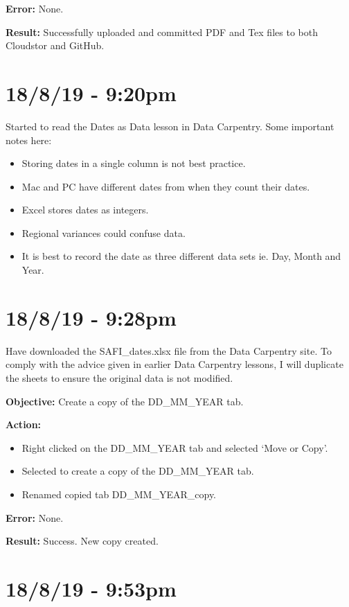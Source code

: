 \documentclass{article}
\begin{document}
\textbf{Error:} None.

\textbf{Result:} Successfully uploaded and committed PDF and Tex files to both Cloudstor and GitHub.

\section*{18/8/19 - 9:20pm}

Started to read the Dates as Data lesson in Data Carpentry. Some important notes here:

\begin{itemize}
    \item Storing dates in a single column is not best practice.
    \item Mac and PC have different dates from when they count their dates.
    \item Excel stores dates as integers.
    \item Regional variances could confuse data.
    \item It is best to record the date as three different data sets ie. Day, Month and Year.
\end{itemize}

\section*{18/8/19 - 9:28pm}

Have downloaded the SAFI\_dates.xlsx file from the Data Carpentry site. To comply with the advice given in earlier Data Carpentry lessons, I will duplicate the sheets to ensure the original data is not modified.

\textbf{Objective:} Create a copy of the DD\_MM\_YEAR tab.

\textbf{Action:}
\begin{itemize}
    \item Right clicked on the DD\_MM\_YEAR tab and selected ‘Move or Copy’.
    \item Selected to create a copy of the DD\_MM\_YEAR tab.
    \item Renamed copied tab DD\_MM\_YEAR\_copy.
\end{itemize}

\textbf{Error:} None.

\textbf{Result:} Success. New copy created.

\section*{18/8/19 - 9:53pm}
\end{document}
